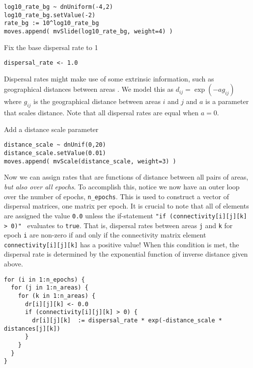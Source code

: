 \begin{snugshade}
\begin{lstlisting}
log10_rate_bg ~ dnUniform(-4,2)
log10_rate_bg.setValue(-2)
rate_bg := 10^log10_rate_bg
moves.append( mvSlide(log10_rate_bg, weight=4) )
\end{lstlisting}
\end{snugshade}


Fix the base dispersal rate to 1

\begin{snugshade}
\begin{lstlisting}
dispersal_rate <- 1.0
\end{lstlisting}
\end{snugshade}

Dispersal rates might make use of some extrinsic information, such as geographical distances between areas \citep{MacArthur1967, Webb2012}.
We model this as $d_{ij} = \exp(-a g_{ij})$ where $g_{ij}$ is the geographical distance between areas $i$ and $j$ and $a$ is a parameter that scales distance.
Note that all dispersal rates are equal when $a=0$.

Add a distance scale parameter

\begin{snugshade}
\begin{lstlisting}
distance_scale ~ dnUnif(0,20)
distance_scale.setValue(0.01)
moves.append( mvScale(distance_scale, weight=3) )
\end{lstlisting}
\end{snugshade}

Now we can assign rates that are functions of distance between all pairs of areas, {\it but also over all epochs}.
To accomplish this, notice we now have an outer loop over the number of epochs, {\tt n\_epochs}.
This is used to construct a vector of dispersal matrices, one matrix per epoch.
It is crucial to note that all of elements are assigned the value {\tt 0.0} unless the if-statement {\tt "if (connectivity[i][j][k] > 0)" } evaluates to {\tt true}.
That is, dispersal rates between areas {\tt j} and {\tt k} for epoch {\tt i} are non-zero if and only if the connectivity matrix element {\tt connectivity[i][j][k]} has a positive value!
When this condition is met, the dispersal rate is determined by the exponential function of inverse distance given above.


\begin{snugshade}
\begin{lstlisting}
for (i in 1:n_epochs) {
  for (j in 1:n_areas) {
    for (k in 1:n_areas) {
      dr[i][j][k] <- 0.0
      if (connectivity[i][j][k] > 0) {
        dr[i][j][k]  := dispersal_rate * exp(-distance_scale * distances[j][k])
      }
    }
  }
}
\end{lstlisting}
\end{snugshade}


